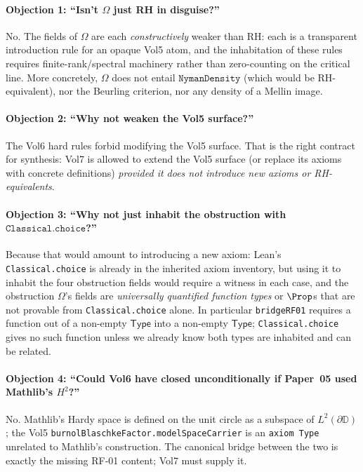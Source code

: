 \documentclass[11pt]{article}
\theoremstyle{plain}
\theoremstyle{definition}
\theoremstyle{remark}
\newcommand{\HtH}{H^{2}}
\newcommand{\D}{\mathbb{D}}
\newcommand{\code}[1]{\texttt{#1}}
\newcommand{\Type}{\mathsf{Type}}
\newcommand{\Obs}{\Omega}
\begin{document}
\paragraph{Objection 1: ``Isn't \(\Obs\) just RH in disguise?''}
No.  The fields of \(\Obs\) are each \emph{constructively}
weaker than RH: each is a transparent introduction rule for an
opaque Vol5 atom, and the inhabitation of these rules requires
finite-rank/spectral machinery rather than zero-counting on the
critical line.  More concretely, \(\Obs\) does not entail
\(\code{NymanDensity}\) (which would be RH-equivalent), nor
the Beurling criterion, nor any density of a Mellin image.

\paragraph{Objection 2: ``Why not weaken the Vol5 surface?''}
The Vol6 hard rules forbid modifying the Vol5 surface.  That is
the right contract for synthesis: Vol7 is allowed to extend the
Vol5 surface (or replace its axioms with concrete definitions)
\emph{provided it does not introduce new axioms or RH-equivalents}.

\paragraph{Objection 3: ``Why not just inhabit the obstruction with
\(\code{Classical.choice}\)?''}
Because that would amount to introducing a new axiom: Lean's
\code{Classical.choice} is already in the inherited axiom inventory,
but using it to inhabit the four obstruction fields would require
a witness in each case, and the obstruction \(\Obs\)'s
fields are \emph{universally quantified function types} or \(\Prop\)s
that are not provable from \code{Classical.choice} alone.  In
particular \code{bridgeRF01} requires a function out of a non-empty
\(\Type\) into a non-empty \(\Type\); \code{Classical.choice} gives no
such function unless we already know both types are inhabited and
can be related.

\paragraph{Objection 4: ``Could Vol6 have closed unconditionally
if Paper~05 used Mathlib's \(\HtH\)?''}
No.  Mathlib's Hardy space is defined on the unit circle as a
subspace of \(L^{2}(\partial\D)\); the Vol5
\code{burnolBlaschkeFactor.modelSpaceCarrier} is an
\code{axiom Type} unrelated to Mathlib's construction.  The
canonical bridge between the two is exactly the missing RF-01
content; Vol7 must supply it.
\end{document}
